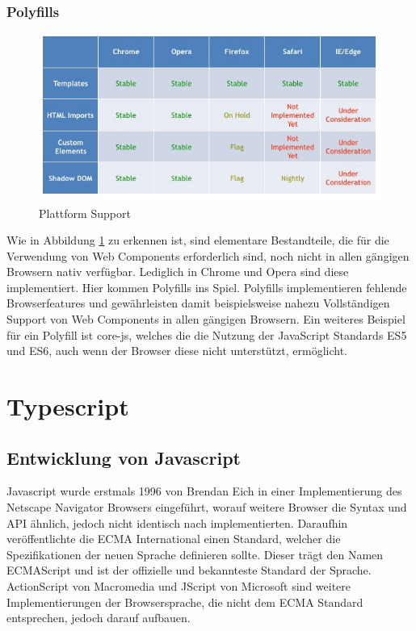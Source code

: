 \subsubsection{Polyfills}
\begin{figure}[htp]
 \centering
 \includegraphics[width=0.8\linewidth]{kapitel2/platform_support.jpg}
 \caption{Plattform Support \cite{WebCo43:online}}
 \label{fig:platform_support}
\end{figure}

\noindent Wie in Abbildung \ref{fig:platform_support} zu erkennen ist, sind elementare Bestandteile, die für die Verwendung von Web Components erforderlich sind, noch nicht in
allen gängigen Browsern nativ verfügbar. Lediglich in Chrome und Opera sind diese implementiert.
Hier kommen Polyfills ins Spiel. Polyfills implementieren fehlende Browserfeatures und gewährleisten damit beispielsweise nahezu Vollständigen
Support von Web Components in allen gängigen Browsern. Ein weiteres Beispiel für ein Polyfill ist core-js,
welches die die Nutzung der JavaScript Standards ES5 und ES6, auch wenn der Browser diese nicht unterstützt, ermöglicht.



\section{Typescript}

\subsection{Entwicklung von Javascript}


Javascript wurde erstmals 1996 von Brendan Eich in einer Implementierung des Netscape Navigator Browsers eingeführt,
worauf weitere Browser die Syntax und API ähnlich, jedoch nicht identisch nach implementierten.
Daraufhin veröffentlichte die ECMA International einen Standard, welcher die Spezifikationen der neuen Sprache
definieren sollte. Dieser trägt den Namen ECMAScript und ist der offizielle und bekannteste Standard der
Sprache. ActionScript von Macromedia und JScript von Microsoft sind weitere Implementierungen der Browsersprache,
die nicht dem ECMA Standard entsprechen, jedoch darauf aufbauen.

